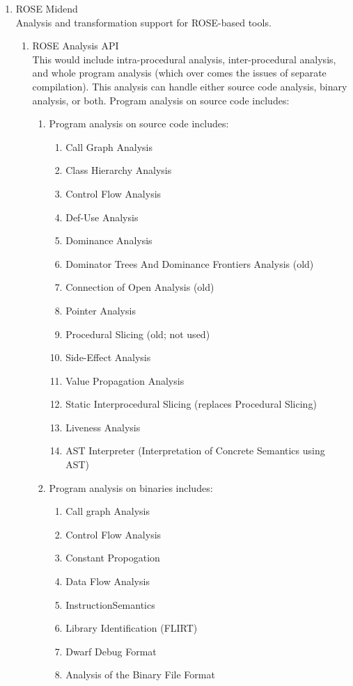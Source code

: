 \begin{enumerate}
   \item ROSE Midend \\
      Analysis and transformation support for ROSE-based tools.
   \begin{enumerate}
      \item ROSE Analysis API \\
         This would include intra-procedural analysis, inter-procedural analysis, 
         and whole program analysis (which over comes the issues of separate compilation).
         This analysis can handle either source code analysis, binary analysis, or both.
         Program analysis on source code includes:
         \begin{enumerate}
            \item Program analysis on source code includes:
            \begin{enumerate}
               \item Call Graph Analysis
               \item Class Hierarchy Analysis
               \item Control Flow Analysis
               \item Def-Use Analysis
               \item Dominance Analysis
               \item Dominator Trees And Dominance Frontiers Analysis (old)
               \item Connection of Open Analysis (old)
               \item Pointer Analysis
               \item Procedural Slicing (old; not used) 
               \item Side-Effect Analysis
               \item Value Propagation Analysis
               \item Static Interprocedural Slicing (replaces Procedural Slicing)
               \item Liveness Analysis
               \item AST Interpreter (Interpretation of Concrete Semantics using AST)
            \end{enumerate}
            \item Program analysis on binaries includes:
            \begin{enumerate}
               \item Call graph Analysis
               \item Control Flow Analysis
               \item Constant Propogation
               \item Data Flow Analysis
               \item InstructionSemantics
               \item Library Identification (FLIRT)
               \item Dwarf Debug Format
               \item Analysis of the Binary File Format
            \end{enumerate}
         \end{enumerate}


\end{enumerate}
\end{enumerate}

